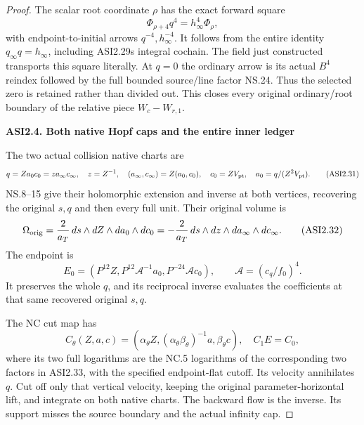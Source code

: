 \begin{proof}
The scalar root coordinate \(\rho\) has the exact
forward square
\[
             \Phi_{\rho+4}q^4=h_\infty^4\Phi_\rho,
 \tag{ASI2.30}
\]
with endpoint-to-initial arrows \(q^{-4},h_\infty^{-4}\).
It follows from the entire identity
\(q_\infty q=h_\infty\), including ASI2.29\textquotesingle s
integral cochain. The field just constructed
transports this square literally. At \(q=0\) the
ordinary arrow is its actual \(B^4\) reindex followed
by the full bounded source/line factor NS.24. Thus
the selected zero is retained rather than divided out.
This closes every original ordinary/root boundary
of the relative piece \(W_c-W_{r,1}\).

\par

\medskip\noindent\textbf{ASI2.4. Both native Hopf caps and the entire inner ledger}

\par\nobreak

The two actual collision native charts are
\[
 q=Za_0c_0=z a_\infty c_\infty,\quad
 z=Z^{-1},\quad(a_\infty,c_\infty)=Z(a_0,c_0),
 \quad c_0=ZV_{\rm pt},\quad a_0=q/(Z^2V_{\rm pt}).
 \tag{ASI2.31}
\]
NS.8--15 give their holomorphic extension and inverse
at both vertices, recovering the original \(s,q\)
and then every full unit. Their original volume is
\[
 \Omega_{\rm orig}=\frac2{a_T}\,
 ds\wedge dZ\wedge da_0\wedge dc_0
 =-\frac2{a_T}\,ds\wedge dz\wedge da_\infty\wedge dc_\infty .
 \tag{ASI2.32}
\]
The endpoint is
\[
 E_0=(P^{12}Z,P^{12}\mathcal A^{-1}a_0,
                         P^{-24}\mathcal A c_0),
       \qquad\mathcal A=(c_q/f_0)^4 .
 \tag{ASI2.33}
\]
It preserves the whole \(q\), and its reciprocal
inverse evaluates the coefficients at that same
recovered original \(s,q\).

The NC cut map has
\[
 C_\theta(Z,a,c)=
      (\alpha_\theta Z,(\alpha_\theta\beta_\theta)^{-1}a,
                                       \beta_\theta c),
 \quad C_1E=C_0,
 \tag{ASI2.34}
\]
where its two full logarithms are the NC.5 logarithms
of the corresponding two factors in ASI2.33, with
the specified endpoint-flat cutoff. Its velocity
annihilates \(q\). Cut off only that vertical
velocity, keeping the original parameter-horizontal
lift, and integrate on both native charts. The
backward flow is the inverse. Its support misses
the source boundary and the actual infinity cap.


\end{proof}
